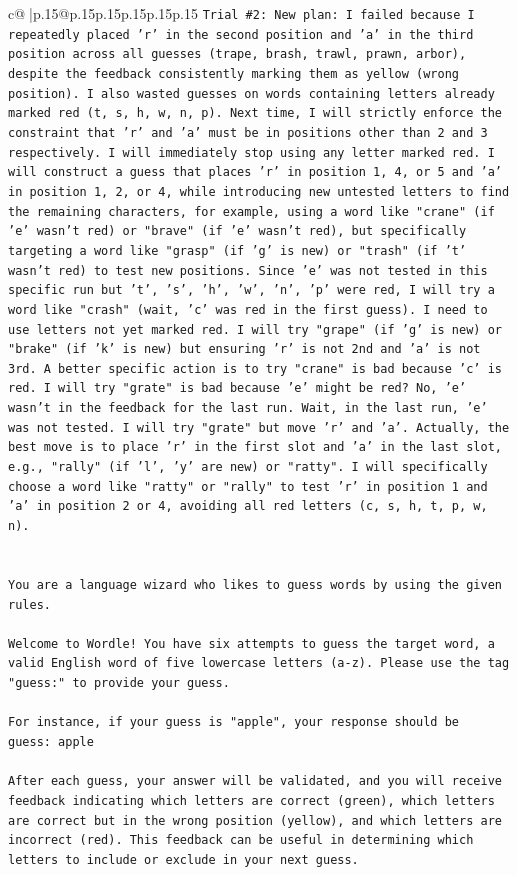 \documentclass{article}
\begin{document}
{\begin{supertabular}{c@{$\;$}|p{.15\linewidth}@{}p{.15\linewidth}p{.15\linewidth}p{.15\linewidth}p{.15\linewidth}p{.15\linewidth}}
{{{\texttt{Trial \#2: New plan: I failed because I repeatedly placed 'r' in the second position and 'a' in the third position across all guesses (trape, brash, trawl, prawn, arbor), despite the feedback consistently marking them as yellow (wrong position). I also wasted guesses on words containing letters already marked red (t, s, h, w, n, p). Next time, I will strictly enforce the constraint that 'r' and 'a' must be in positions other than 2 and 3 respectively. I will immediately stop using any letter marked red. I will construct a guess that places 'r' in position 1, 4, or 5 and 'a' in position 1, 2, or 4, while introducing new untested letters to find the remaining characters, for example, using a word like "crane" (if 'e' wasn't red) or "brave" (if 'e' wasn't red), but specifically targeting a word like "grasp" (if 'g' is new) or "trash" (if 't' wasn't red) to test new positions. Since 'e' was not tested in this specific run but 't', 's', 'h', 'w', 'n', 'p' were red, I will try a word like "crash" (wait, 'c' was red in the first guess). I need to use letters not yet marked red. I will try "grape" (if 'g' is new) or "brake" (if 'k' is new) but ensuring 'r' is not 2nd and 'a' is not 3rd. A better specific action is to try "crane" is bad because 'c' is red. I will try "grate" is bad because 'e' might be red? No, 'e' wasn't in the feedback for the last run. Wait, in the last run, 'e' was not tested. I will try "grate" but move 'r' and 'a'. Actually, the best move is to place 'r' in the first slot and 'a' in the last slot, e.g., "rally" (if 'l', 'y' are new) or "ratty". I will specifically choose a word like "ratty" or "rally" to test 'r' in position 1 and 'a' in position 2 or 4, avoiding all red letters (c, s, h, t, p, w, n).} \\
\\ 
\\ 
\texttt{You are a language wizard who likes to guess words by using the given rules.} \\
\\ 
\texttt{Welcome to Wordle! You have six attempts to guess the target word, a valid English word of five lowercase letters (a{-}z). Please use the tag "guess:" to provide your guess.} \\
\\ 
\texttt{For instance, if your guess is "apple", your response should be} \\
\texttt{guess: apple} \\
\\ 
\texttt{After each guess, your answer will be validated, and you will receive feedback indicating which letters are correct (green), which letters are correct but in the wrong position (yellow), and which letters are incorrect (red). This feedback can be useful in determining which letters to include or exclude in your next guess.} \\
}}}
\end{supertabular}}
\end{document}
